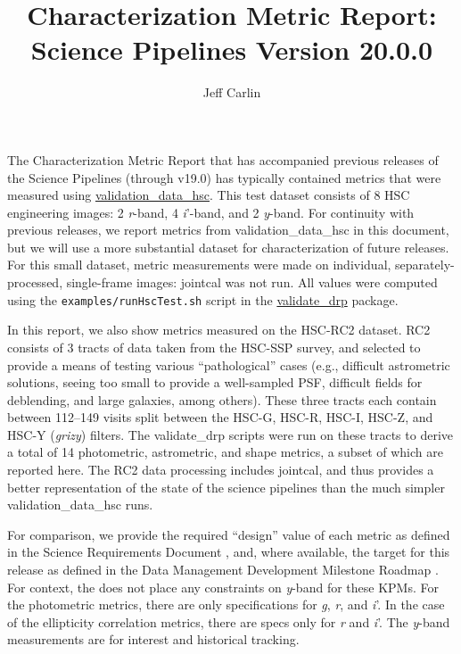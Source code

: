 \documentclass[DM,lsstdraft,toc]{lsstdoc}
\title{Characterization Metric Report: Science Pipelines Version 20.0.0}
\author{%
Jeff Carlin
}
\date{\vcsDate}
\begin{document}
\maketitle


The Characterization Metric Report that has accompanied previous releases of the Science Pipelines (through v19.0) has typically contained metrics that were measured using \href{https://github.com/lsst/validation_data_hsc}{validation\_data\_hsc}. This test dataset consists of 8 HSC engineering images: 2 \emph{r}-band, 4 \emph{i}'-band, and 2 \emph{y}-band. For continuity with previous releases, we report metrics from validation\_data\_hsc in this document, but we will use a more substantial dataset for characterization of future releases. For this small dataset, metric measurements were made on individual, separately-processed, single-frame images: jointcal was not run. All values were computed using the \texttt{examples/runHscTest.sh} script in the \href{https://github.com/lsst/validate_drp}{validate\_drp} package.

In this report, we also show metrics measured on the HSC-RC2 dataset. RC2 consists of 3 tracts of data taken from the HSC-SSP survey, and selected to provide a means of testing various ``pathological'' cases (e.g., difficult astrometric solutions, seeing too small to provide a well-sampled PSF, difficult fields for deblending, and large galaxies, among others). These three tracts each contain between 112--149 visits split between the HSC-G, HSC-R, HSC-I, HSC-Z, and HSC-Y (\emph{grizy}) filters. The validate\_drp scripts were run on these tracts to derive a total of 14 photometric, astrometric, and shape metrics, a subset of which are reported here. The RC2 data processing includes jointcal, and thus provides a better representation of the state of the science pipelines than the much simpler validation\_data\_hsc runs.

For comparison, we provide the \SRD required ``design'' value of each metric as defined in the Science Requirements Document , and, where available, the target for this release as defined in the Data Management Development Milestone Roadmap . For context, the \SRD does not place any constraints on \emph{y}-band for these KPMs.  For the photometric metrics, there are only specifications for \emph{g}, \emph{r}, and \emph{i}'. In the case of the ellipticity correlation metrics, there are specs only for \emph{r} and \emph{i}'. The \emph{y}-band measurements are for interest and historical tracking.
\end{document}
